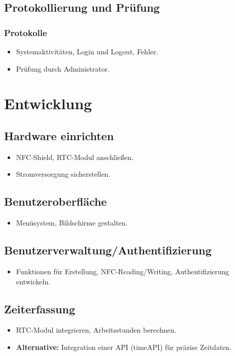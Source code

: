 \documentclass{article}
\begin{document}
\subsection*{Protokollierung und Prüfung}

\subsubsection*{Protokolle}
\begin{itemize}
  \item Systemaktivitäten, Login und Logout, Fehler.
  \item Prüfung durch Administrator.
\end{itemize}

\section*{Entwicklung}

\subsection*{Hardware einrichten}
\begin{itemize}
  \item NFC-Shield, RTC-Modul anschließen.
  \item Stromversorgung sicherstellen.
\end{itemize}

\subsection*{Benutzeroberfläche}
\begin{itemize}
  \item Menüsystem, Bildschirme gestalten.
\end{itemize}

\subsection*{Benutzerverwaltung/Authentifizierung}
\begin{itemize}
  \item Funktionen für Erstellung, NFC-Reading/Writing, Authentifizierung entwickeln.
\end{itemize}

\subsection*{Zeiterfassung}
\begin{itemize}
  \item RTC-Modul integrieren, Arbeitsstunden berechnen.
  \item \textbf{Alternative:} Integration einer API (timeAPI) für präzise Zeitdaten.
\end{itemize}
\end{document}
